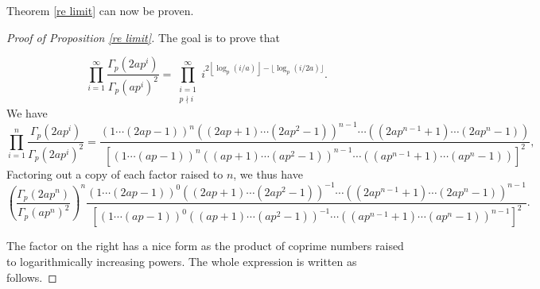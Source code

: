 \documentclass[12pt, letter]{article}    %
\theoremstyle{plain}
\theoremstyle{definition}
\numberwithin{equation}{section}
\newcommand{\thref}[1]{Theorem \ref{#1}}
\newcommand{\propref}[1]{Proposition \ref{#1}}
\providecommand{\floor}[1]{\left \lfloor #1 \right \rfloor }
\begin{document}
\thref{re limit} can now be proven.
\begin{proof}[Proof of \propref{re limit}]

The goal is to prove that 

$$
\prod_{i=1}^{\infty}\frac{\Gamma_p(2ap^i)}{\Gamma_p(ap^i)^2}=
\prod_{\substack{i=1\\p\nmid i}}^{\infty}i^{2\floor{\log_p(i/a)}-\lfloor{\log_p(i/2a)}\rfloor}.$$
We have
$$\prod_{i=1}^{n}\frac{\Gamma_p (2ap^i)}{\Gamma_p (2ap^i)^2} = \frac{(1 \cdots (2ap-1))^n((2ap+1) \cdots (2ap^2-1))^{n-1}\cdots((2ap^{n-1}+1) \cdots (2ap^{n}-1))}{[(1 \cdots (ap-1))^n((ap+1) \cdots (ap^2-1))^{n-1}\cdots((ap^{n-1}+1) \cdots (ap^{n}-1))]^2},
$$
Factoring out a copy of each factor raised to $n$, we thus have
$$
\left(\frac{ \Gamma_p (2ap^n)}{ \Gamma_p (ap^n)^2}\right)^n \frac{(1 \cdots (2ap-1))^0((2ap+1) \cdots (2ap^2-1))^{-1}\cdots((2ap^{n-1}+1) \cdots (2ap^{n}-1))^{n-1}}{[(1 \cdots (ap-1))^0((ap+1) \cdots (ap^2-1))^{-1}\cdots((ap^{n-1}+1) \cdots (ap^{n}-1))^{n-1}]^2}.
$$

The factor on the right has a nice form as the product of coprime numbers raised to logarithmically increasing powers. The whole expression is written as follows.


\end{proof}
\end{document}
